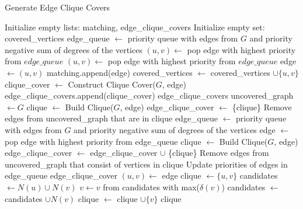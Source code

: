 \begin{algorithm}
\caption{Generate Edge Clique Covers}
\begin{algorithmic}[1]
\State Initialize empty lists: matching, edge\_clique\_covers
\State Initialize empty set: covered\_vertices
\State edge\_queue $\gets$ priority queue with edges from $G$ and priority negative sum of degrees of the vertices
    \State $(u, v)\gets$ pop edge with highest priority from $edge\_queue$
        \State $(u, v)\gets$ pop edge with highest priority from $edge\_queue$
    \EndWhile
    \State edge $\gets (u, v)$
    \State matching.append(edge)
    \State covered\_vertices $\gets$ covered\_vertices $\cup \{u, v\}$
\EndFor
{}
    \State clique\_cover $\gets$ Construct Clique Cover($G$, edge)
    \State edge\_clique\_covers.append(clique\_cover)
\EndFor
\State \Return edge\_clique\_covers
\EndProcedure
{}
\State uncovered\_graph $\gets G$
\State clique $\gets$ Build Clique($G$, edge)
\State edge\_clique\_cover $\gets$ \{clique\}
\State Remove edges from uncovered\_graph that are in clique
\State edge\_queue $\gets$ priority queue with edges from $G$ and priority negative sum of degrees of the vertices
    \State edge $\gets$ pop edge with highest priority from edge\_queue
    \State clique $\gets$ Build Clique($G$, edge)
    \State edge\_clique\_cover $\gets$ edge\_clique\_cover $\cup$ \{clique\}
    \State Remove edges from uncovered\_graph that consist of vertices in clique
    \State Update priorities of edges in edge\_queue
\EndWhile
\State \Return edge\_clique\_cover
\EndProcedure
{}
\State $(u, v)\gets$ edge
\State clique $\gets \{u, v\}$
\State candidates $\gets N(u)\cup N(v)$
    \State $v\gets v$ from candidates with max($\delta(v)$)
    \State candidates $\gets$ candidates $\cup N(v)$
    \State clique $\gets$ clique $\cup \{v\}$
\EndWhile
\Return clique
\EndProcedure
\end{algorithmic}
\end{algorithm}

